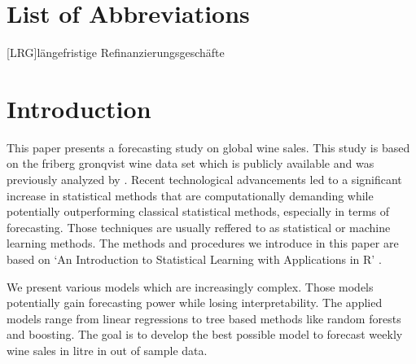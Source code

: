 \documentclass[11pt,]{article}
\begin{document}
\newpage
\listoffigures
{}

\listoftables
{}

\section*{List of Abbreviations}

\begin{adjustwidth}{1.5em}{0pt}

\begin{acronym}[dummyyyy]
 [LRG]{längefristige Refinanzierungsgeschäfte}

\end{acronym}

\end{adjustwidth}

\restoregeometry

\newpage
{}
\hypertarget{introduction}{%
\section{Introduction}\label{introduction}}

This paper presents a forecasting study on global wine sales. This study
is based on the friberg gronqvist wine data set which is publicly
available and was previously analyzed by
\textcite[][p. 193f.]{Friberg2012}. Recent technological advancements
led to a significant increase in statistical methods that are
computationally demanding while potentially outperforming classical
statistical methods, especially in terms of forecasting. Those
techniques are usually reffered to as statistical or machine learning
methods. The methods and procedures we introduce in this paper are based
on `An Introduction to Statistical Learning with Applications in R'
\autocite[][]{James2014}.

We present various models which are increasingly complex. Those models
potentially gain forecasting power while losing interpretability. The
applied models range from linear regressions to tree based methods like
random forests and boosting. The goal is to develop the best possible
model to forecast weekly wine sales in litre in out of sample data.
\end{document}

